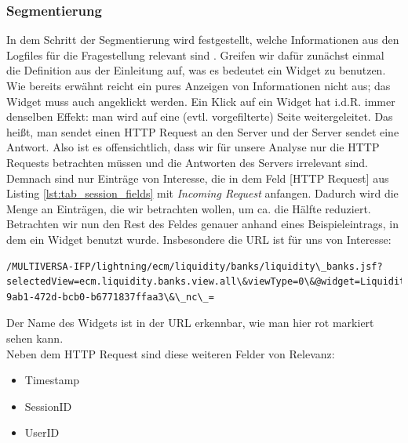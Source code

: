 \subsubsection{Segmentierung}
\label{ssub:Segmentierung}

In dem Schritt der Segmentierung wird festgestellt, welche Informationen aus den Logfiles für die Fragestellung relevant sind \citep{DuHaSt01}. Greifen wir dafür zunächst einmal die Definition aus der Einleitung auf, was es bedeutet ein Widget zu benutzen. Wie bereits erwähnt reicht ein pures Anzeigen von Informationen nicht aus; das Widget muss auch angeklickt werden. Ein Klick auf ein Widget hat i.d.R. immer denselben Effekt: man wird auf eine (evtl. vorgefilterte) Seite weitergeleitet. Das heißt, man sendet einen HTTP Request an den Server und der Server sendet eine Antwort. Also ist es offensichtlich, dass wir für unsere Analyse nur die HTTP Requests betrachten müssen und die Antworten des Servers irrelevant sind. Demnach sind nur Einträge von Interesse, die in dem Feld [HTTP Request] aus Listing \ref{lst:tab_session_fields} mit \textit{Incoming Request} anfangen. Dadurch wird die Menge an Einträgen, die wir betrachten wollen, um ca. die Hälfte reduziert.\\
Betrachten wir nun den Rest des Feldes genauer anhand eines Beispieleintrags, in dem ein Widget benutzt wurde. Insbesondere die URL ist für uns von Interesse:\\
\begin{lstlisting}[style=base,numbers=none,caption = Beispiel URL,captionpos=b,label=lst:url-beispiel]
/MULTIVERSA-IFP/lightning/ecm/liquidity/banks/liquidity\_banks.jsf?selectedView=ecm.liquidity.banks.view.all\&viewType=0\&@widget=LiquidityByBanksWidgetContent@\&banks=RpBLVhy85c5u4nGKeISH0A\&conversationContext=3\&\_ns\_=f63a91bc-9ab1-472d-bcb0-b6771837ffaa3\&\_nc\_=
\end{lstlisting}
Der Name des Widgets ist in der URL erkennbar, wie man hier rot markiert sehen kann.\\
Neben dem HTTP Request sind diese weiteren Felder von Relevanz:\\
\begin{itemize}
	\item Timestamp
	\item SessionID
	\item UserID
\end{itemize}

